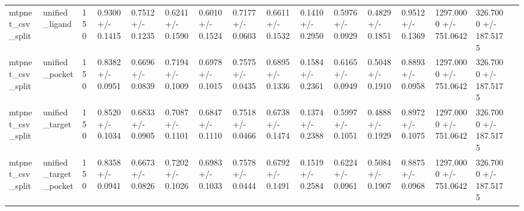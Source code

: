 \begin{longtable}{llllllllllllllll}
mtpnet\_csv\_split & unified\_ligand & 150 & 0.9300 +/- 0.1415 & 0.7512 +/- 0.1235 & 0.6241 +/- 0.1590 & 0.6010 +/- 0.1524 & 0.7177 +/- 0.0603 & 0.6611 +/- 0.1532 & 0.1410 +/- 0.2950 & 0.5976 +/- 0.0929 & 0.4829 +/- 0.1851 & 0.9512 +/- 0.1369 & 1297.0000 +/- 751.0642 & 326.7000 +/- 187.5175 &  \\
mtpnet\_csv\_split & unified\_pocket & 150 & 0.8382 +/- 0.0951 & 0.6696 +/- 0.0839 & 0.7194 +/- 0.1009 & 0.6978 +/- 0.1015 & 0.7575 +/- 0.0435 & 0.6895 +/- 0.1336 & 0.1584 +/- 0.2361 & 0.6165 +/- 0.0949 & 0.5048 +/- 0.1910 & 0.8893 +/- 0.0958 & 1297.0000 +/- 751.0642 & 326.7000 +/- 187.5175 &  \\
mtpnet\_csv\_split & unified\_target & 150 & 0.8520 +/- 0.1034 & 0.6833 +/- 0.0905 & 0.7087 +/- 0.1101 & 0.6847 +/- 0.1110 & 0.7518 +/- 0.0466 & 0.6738 +/- 0.1474 & 0.1374 +/- 0.2388 & 0.5997 +/- 0.1051 & 0.4888 +/- 0.1929 & 0.8972 +/- 0.1075 & 1297.0000 +/- 751.0642 & 326.7000 +/- 187.5175 &  \\
mtpnet\_csv\_split & unified\_target\_pocket & 150 & 0.8358 +/- 0.0941 & 0.6673 +/- 0.0826 & 0.7202 +/- 0.1026 & 0.6983 +/- 0.1033 & 0.7578 +/- 0.0444 & 0.6792 +/- 0.1491 & 0.1519 +/- 0.2584 & 0.6224 +/- 0.0961 & 0.5084 +/- 0.1907 & 0.8875 +/- 0.0968 & 1297.0000 +/- 751.0642 & 326.7000 +/- 187.5175 &  \\
\end{longtable}
